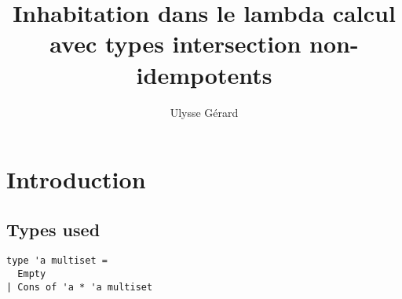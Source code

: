 \documentclass{article}
\title{\textbf{Inhabitation dans le lambda calcul avec types intersection non-idempotents}}
\author{Ulysse Gérard}
\begin{document}
\maketitle

\section{Introduction}

\subsection{Types used}

\begin{lstlisting}[caption={A simple polymorphic type for multisets}]
type 'a multiset =
  Empty
| Cons of 'a * 'a multiset
\end{lstlisting}
\end{document}
